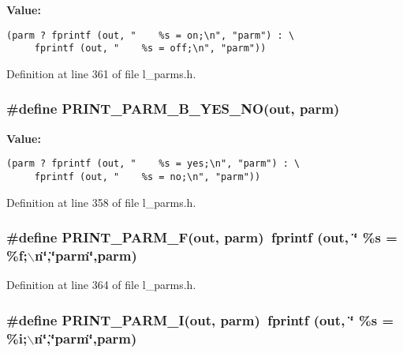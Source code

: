 \textbf{Value:}

\begin{Code}\begin{verbatim}(parm ? fprintf (out, "    %s = on;\n", "parm") : \
     fprintf (out, "    %s = off;\n", "parm"))
\end{verbatim}\end{Code}


Definition at line 361 of file l\_\-parms.h.
\subsubsection{\setlength{\rightskip}{0pt plus 5cm}\#define PRINT\_\-PARM\_\-B\_\-YES\_\-NO(out, parm)}\label{l__parms_8h_18dbb6e8e2ee9880e7b065e6940ea51a}


\textbf{Value:}

\begin{Code}\begin{verbatim}(parm ? fprintf (out, "    %s = yes;\n", "parm") : \
     fprintf (out, "    %s = no;\n", "parm"))
\end{verbatim}\end{Code}


Definition at line 358 of file l\_\-parms.h.
\subsubsection{\setlength{\rightskip}{0pt plus 5cm}\#define PRINT\_\-PARM\_\-F(out, parm)~fprintf (out, \char`\"{}    \%s = \%f;$\backslash$n\char`\"{},\char`\"{}parm\char`\"{},parm)}\label{l__parms_8h_4b0a1271b752ffdf8f5fa434df5cbbb4}




Definition at line 364 of file l\_\-parms.h.
\subsubsection{\setlength{\rightskip}{0pt plus 5cm}\#define PRINT\_\-PARM\_\-I(out, parm)~fprintf (out, \char`\"{}    \%s = \%i;$\backslash$n\char`\"{},\char`\"{}parm\char`\"{},parm)}\label{l__parms_8h_d0fd01fb39ad34b830b521efba412aaa}




